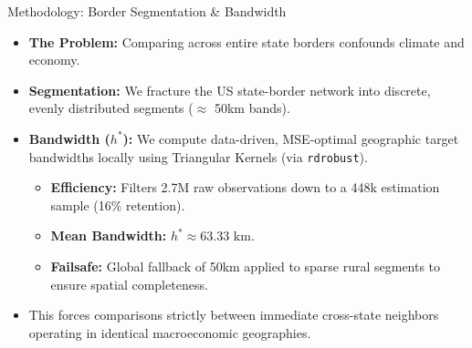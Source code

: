 \documentclass[10pt, aspectratio=169]{beamer}
\begin{document}
\begin{frame}{Methodology: Border Segmentation \& Bandwidth}
    \begin{itemize}
        \item \textbf{The Problem:} Comparing across entire state borders confounds climate and economy.  
        \item \textbf{Segmentation:} We fracture the US state-border network into discrete, evenly distributed segments ($\approx$ 50km bands). 
        \item \textbf{Bandwidth ($h^*$):} We compute data-driven, MSE-optimal geographic target bandwidths locally using Triangular Kernels (via \texttt{rdrobust}).
        \begin{itemize}
            \item \textbf{Efficiency:} Filters 2.7M raw observations down to a 448k estimation sample (16\% retention).
            \item \textbf{Mean Bandwidth:} $h^* \approx 63.33$ km.
            \item \textbf{Failsafe:} Global fallback of 50km applied to sparse rural segments to ensure spatial completeness.
        \end{itemize}
        \item This forces comparisons strictly between immediate cross-state neighbors operating in identical macroeconomic geographies.
    \end{itemize}
\end{frame}
\end{document}
